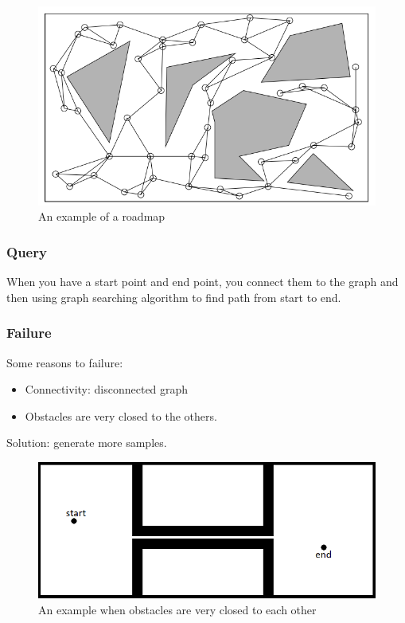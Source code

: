 \documentclass[11pt]{article}
\begin{document}
\begin{figure}[h]
\includegraphics{roadmap}
\centering
\caption{An example of a roadmap }
\label{fig:roadmap_example}
\end{figure}

\subsubsection{Query}
When you have a start point and end point, you connect them to the graph and then using graph searching algorithm to find path from start to end.

\subsubsection{Failure}
Some reasons to failure:
\begin{itemize}
\item Connectivity: disconnected graph
\item Obstacles are very closed to the others. 
\end{itemize}
Solution: generate more samples.\\

\begin{figure}
\includegraphics{closed_obs}
\centering
\caption{An example when obstacles are very closed to each other}
\label{fig:closed_obs}
\end{figure}
\end{document}
